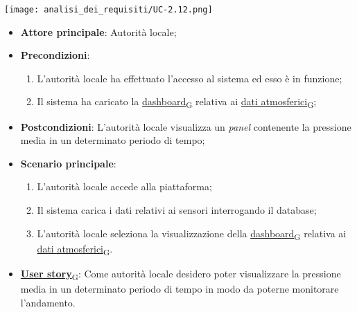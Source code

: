 \begin{center}
	\texttt{[image: analisi\_dei\_requisiti/UC-2.12.png]}
\end{center}
\begin{itemize}
	\item \textbf{Attore principale}: Autorità locale;
	\item \textbf{Precondizioni}:
	      \begin{enumerate}
		      \item L'autorità locale ha effettuato l'accesso al sistema ed esso è in funzione;
		      \item Il sistema ha caricato la \href{https://7last.github.io/docs/rtb/documentazione-interna/glossario\#dashboard}{dashboard\textsubscript{G}} relativa ai \href{https://7last.github.io/docs/rtb/documentazione-interna/glossario\#dati-atmosferici}{dati atmosferici\textsubscript{G}};
	      \end{enumerate}

	\item \textbf{Postcondizioni}: L'autorità locale visualizza un \textit{panel} contenente la pressione media in un determinato periodo di tempo;
	\item \textbf{Scenario principale}:
	      \begin{enumerate}
		      \item L'autorità locale accede alla piattaforma;
		      \item Il sistema carica i dati relativi ai sensori interrogando il database;
		      \item L'autorità locale seleziona la visualizzazione della \href{https://7last.github.io/docs/rtb/documentazione-interna/glossario\#dashboard}{dashboard\textsubscript{G}} relativa ai \href{https://7last.github.io/docs/rtb/documentazione-interna/glossario\#dati-atmosferici}{dati atmosferici\textsubscript{G}}.
	      \end{enumerate}
	\item \href{https://7last.github.io/docs/rtb/documentazione-interna/glossario\#user-story}{\textbf{User story}\textsubscript{G}}: Come autorità locale desidero poter visualizzare la pressione media in un determinato periodo di tempo
	      in modo da poterne monitorare l'andamento.
\end{itemize}

